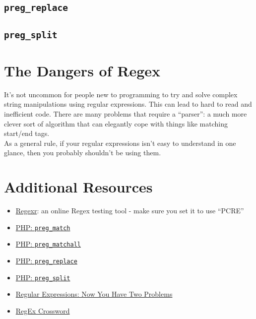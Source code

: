 \subsection{\texttt{preg\_replace}}

\subsection{\texttt{preg\_split}}


\pagebreak


\section{The Dangers of Regex}



It's not uncommon for people new to programming to try and solve complex string manipulations using regular expressions. This can lead to hard to read and inefficient code. There are many problems that require a ``parser'': a much more clever sort of algorithm that can elegantly cope with things like matching start/end tags.
\\

As a general rule, if your regular expressions isn't easy to understand in one glance, then you probably shouldn't be using them.



\section{Additional Resources}

\begin{itemize}[leftmargin=*]
    \item \href{https://regexr.com}{Regexr}: an online Regex testing tool - make sure you set it to use ``PCRE''
    \item \href{http://www.php.net/manual/en/function.preg-match.php}{PHP: \texttt{preg\_match}}
    \item \href{http://www.php.net/manual/en/function.preg-match-all.php}{PHP: \texttt{preg\_matchall}}
    \item \href{http://www.php.net/manual/en/function.preg-replace.php}{PHP: \texttt{preg\_replace}}
    \item \href{http://www.php.net/manual/en/function.preg-split.php}{PHP: \texttt{preg\_split}}
    \item \href{https://blog.codinghorror.com/regular-expressions-now-you-have-two-problems/}{Regular Expressions: Now You Have Two Problems}
    \item \href{http://www.regexcrossword.com/}{RegEx Crossword}
\end{itemize}
